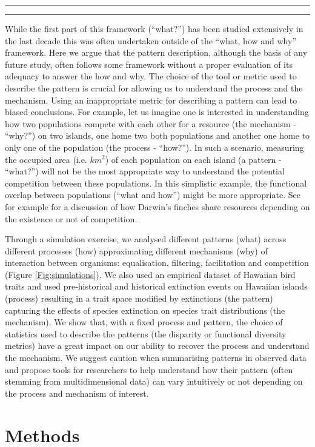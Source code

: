 \documentclass[12pt,letterpaper]{article}
\begin{document}
\bigskip
\hrule
\hrule
\bigskip

While the first part of this framework (``what?'') has been studied extensively in the last decade this was often undertaken outside of the ``what, how and why'' framework.
Here we argue that the pattern description, although the basis of any future study, often follows some framework without a proper evaluation of its adequacy to answer the how and why.
The choice of the tool or metric used to describe the pattern is crucial for allowing us to understand the process and the mechanism.
Using an inappropriate metric for describing a pattern can lead to biased conclusions.
For example, let us imagine one is interested in understanding how two populations compete with each other for a resource (the mechanism - ``why?'') on two islands, one home two both populations and another one home to only one of the population (the process - ``how?'').
In such a scenario, measuring the occupied area (i.e. $km^{2}$) of each population on each island (a pattern - ``what?'') will not be the most appropriate way to understand the potential competition between these populations.
In this simplistic example, the functional overlap between populations (``what and how'') might be more appropriate.
See for example \citealt{carvalho2020decomposing} for a discussion of how Darwin's finches share resources depending on the existence or not of competition.

Through a simulation exercise, we analysed different patterns (what) across different processes (how) approximating different mechanisms (why) of interaction between organisms: equalisation, filtering, facilitation and competition (Figure \ref{Fig:simulations}).
We also used an empirical dataset of Hawaiian bird traits and used pre-historical and historical extinction events on Hawaiian islands (process) resulting in a trait space modified by extinctions (the pattern) capturing the effects of species extinction on species trait distributions (the mechanism).
We show that, with a fixed process and pattern, the choice of statistics used to describe the patterns (the disparity or functional diversity metrics) have a great impact on our ability to recover the process and understand the mechanism.
We suggest caution when summarising patterns in observed data and propose tools for researchers to help understand how their pattern (often stemming from multidimensional data) can vary intuitively or not depending on the process and mechanism of interest.

\section{Methods}
\end{document}
